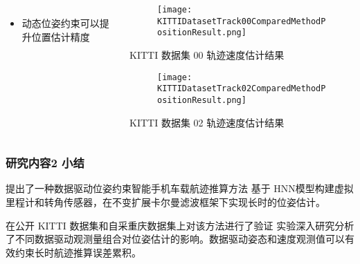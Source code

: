 \begin{frame}
\begin{columns}[t]
\begin{column}{0.6\textwidth}
{\begin{tabular*}{\linewidth}{@{\extracolsep{\fill}}ccrrrrrrrrrr}
					\bottomrule 
				\end{tabular*}  
		   	}
			\begin{itemize}
				\item 动态位姿约束可以提升位置估计精度
			\end{itemize}
		\end{column} 
		\begin{column}{0.4\textwidth}
    		\vspace{-2.2cm}  
		   	\begin{figure}
    			\texttt{[image: KITTIDatasetTrack00ComparedMethodPositionResult.png]}
		   	\end{figure}
		   	\vspace{-0.5cm}
		   	\hspace{0.5cm} {\tiny KITTI 数据集 00 轨迹速度估计结果}
		   	\vspace{-0.2cm}
		   	\begin{figure}
				\texttt{[image: KITTIDatasetTrack02ComparedMethodPositionResult.png]}
		   	\end{figure}
		   	\vspace{-0.5cm}
		   	\hspace{0.5cm} {\tiny KITTI 数据集 02 轨迹速度估计结果}
		\end{column}    
	\end{columns} 		
\end{frame}

\begin{frame}
	\frametitle{研究内容2 小结}
		\begin{block}{提出了一种数据驱动位姿约束智能手机车载航迹推算方法}
		{   
		    \footnotesize
		    基于 HNN模型构建虚拟里程计和转角传感器，在不变扩展卡尔曼滤波框架下实现长时的位姿估计。
		} 
		\end{block}		
		\begin{block}{在公开 KITTI 数据集和自采重庆数据集上对该方法进行了验证}
		{
		    \footnotesize
		    实验深入研究分析了不同数据驱动观测量组合对位姿估计的影响。数据驱动姿态和速度观测值可以有效约束长时航迹推算误差累积。 
		} 
		\end{block}
\end{frame}

